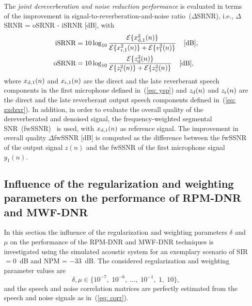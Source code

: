 \documentclass[10pt]{IEEEtran}
\begin{document}
The \emph{joint dereverberation and noise reduction performance} is evaluated in terms of the improvement in signal-to-reverberation-and-noise ratio~($\Delta$SRNR), i.e., $\Delta$SRNR = oSRNR - iSRNR [dB], with 
\begin{align}
{\text{iSRNR}} &= 10 \log_{10} \frac{{\cal{E}} \{x_{{\rm{d}},1}^2(n)\}}{{\cal{E}} \{x_{{\rm{r}},1}^2(n)\} + {\cal{E}} \{v_1^2(n)\}} \; \; \; \; [\rm{dB}], \\
{\text{oSRNR}} &= 10 \log_{10} \frac{{\cal{E}} \{z_{\rm{d}}^2(n)\}}{{\cal{E}} \{z_{\rm{r}}^2(n)\} + {\cal{E}} \{z_v^2(n)\}} \; \; \; \; [\rm{dB}],
\end{align}
where $x_{{\rm{d}},1}(n)$ and $x_{{\rm{r}},1}(n)$ are the direct and the late reverberant speech components in the first microphone defined in~(\ref{eq: ysp}) and $z_{\rm{d}}(n)$ and $z_{\rm{r}}(n)$ are the direct and the late reverberant output speech components defined in~(\ref{eq: zxdzxr}).
In addition, in order to evaluate the overall quality of the dereverberated and denoised signal, the frequency-weighted segmental SNR~(fwSSNR)~\cite{Hu_ITASLP_2008} is used, with $x_{{\rm{d}},1}(n)$ as reference signal. 
The improvement in overall quality $\Delta$fwSSNR [dB] is computed as the difference between the fwSSNR of the output signal $z(n)$ and the fwSSNR of the first microphone signal $y_1(n)$. 
\subsection{{{Influence of the regularization and weighting parameters on the performance of RPM-DNR and MWF-DNR}}}
\label{sec: expb}
In this section the influence of the regularization and weighting parameters $\delta$ and $\mu$ on the performance of the RPM-DNR and MWF-DNR techniques is investigated using the simulated acoustic system for an exemplary scenario of SIR $= 0$~dB and NPM = $-33$~dB.
The considered regularization and weighting parameter values are
\begin{equation}
\delta, \mu \in \{10^{-7}, \; 10^{-6}, \; \ldots, \; 10^{-1}, \; 1, \; 10\},
\end{equation}
and the speech and noise correlation matrices are perfectly estimated from the speech and noise signals as in~(\ref{eq: corr}).
\end{document}
